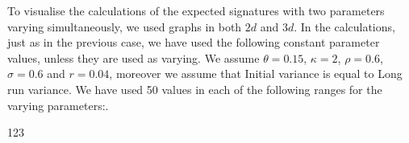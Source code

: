 \documentclass[12pt,a4paper]{report}
\theoremstyle{definition}
\begin{document}

To visualise the calculations of the expected signatures with two parameters varying simultaneously, we used graphs in both $2d$ and $3d$. In the calculations, just as in the previous case, we have used the following constant parameter values, unless they are used as varying. We assume $\theta=0.15$, $\kappa=2$, $\rho=0.6$, $\sigma=0.6$ and $r=0.04$, moreover we assume that Initial variance is equal to Long run variance. We have used 50 values in each of the following ranges for the varying parameters:.



123
\end{document}
